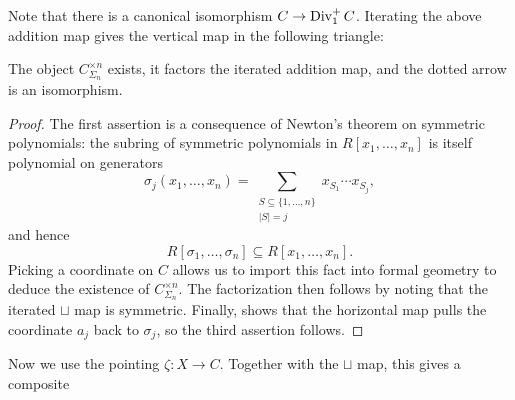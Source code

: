 Note that there is a canonical isomorphism $C \to \operatorname{Div}_1^+ C$.  Iterating the above addition map gives the vertical map in the following triangle:
\begin{center}
\end{center}
\begin{lemma}
The object $C^{\times n}_{\Sigma_n}$ exists, it factors the iterated addition map, and the dotted arrow is an isomorphism. 
\end{lemma}
\begin{proof}
The first assertion is a consequence of Newton's theorem on symmetric polynomials: the subring of symmetric polynomials in $R[x_1, \ldots, x_n]$ is itself polynomial on generators \[\sigma_j(x_1, \ldots, x_n) = \sum_{\substack{S \subseteq \{1, \ldots, n\} \\ |S| = j}} x_{S_1} \cdots x_{S_j},\] and hence \[R[\sigma_1, \ldots, \sigma_n] \subseteq R[x_1, \ldots, x_n].\]  Picking a coordinate on $C$ allows us to import this fact into formal geometry to deduce the existence of $C^{\times n}_{\Sigma_n}$.  The factorization then follows by noting that the iterated $\sqcup$ map is symmetric.  Finally,  shows that the horizontal map pulls the coordinate $a_j$ back to $\sigma_j$, so the third assertion follows.
\end{proof}


Now we use the pointing $\zeta: X \to C$.  Together with the $\sqcup$ map, this gives a composite
\begin{center}
\end{center}

